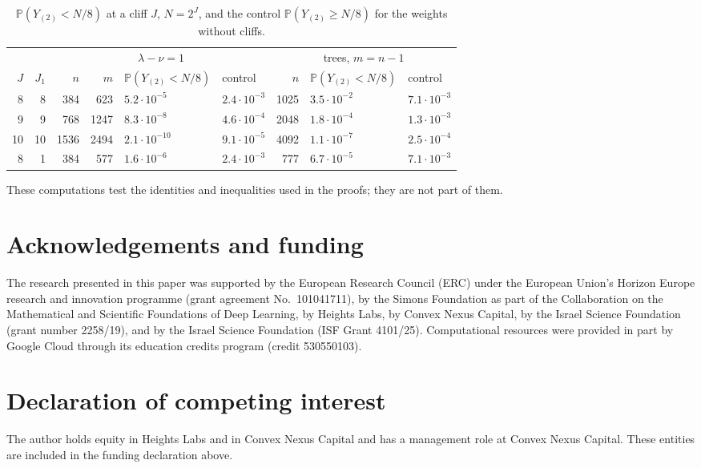 \documentclass[11pt]{amsart}
\theoremstyle{remark}
\numberwithin{equation}{section}
\newcommand{\Pp}{\mathbb P}
\begin{document}
\begin{table}[ht]
\small
\caption{$\Pp(Y_{(2)}<N/8)$ at a cliff $J$, $N=2^J$, and the control $\Pp(Y_{(2)}\ge N/8)$ for the weights without cliffs.}\label{tab:b5}
\begin{tabular}{rrrrllrll}
\toprule
&&\multicolumn{4}{c}{$\lambda-\nu=1$}&\multicolumn{3}{c}{trees, $m=n-1$}\\
\cmidrule(lr){3-6}\cmidrule(lr){7-9}
$J$&$J_1$&$n$&$m$&$\Pp(Y_{(2)}<N/8)$&control&$n$&$\Pp(Y_{(2)}<N/8)$&control\\
\midrule
8&8&384&623&$5.2\cdot10^{-5}$&$2.4\cdot10^{-3}$&1025&$3.5\cdot10^{-2}$&$7.1\cdot10^{-3}$\\
9&9&768&1247&$8.3\cdot10^{-8}$&$4.6\cdot10^{-4}$&2048&$1.8\cdot10^{-4}$&$1.3\cdot10^{-3}$\\
10&10&1536&2494&$2.1\cdot10^{-10}$&$9.1\cdot10^{-5}$&4092&$1.1\cdot10^{-7}$&$2.5\cdot10^{-4}$\\
8&1&384&577&$1.6\cdot10^{-6}$&$2.4\cdot10^{-3}$&777&$6.7\cdot10^{-5}$&$7.1\cdot10^{-3}$\\
\bottomrule
\end{tabular}
\end{table}

These computations test the identities and inequalities used in the proofs; they are not part of them.

\section*{Acknowledgements and funding}
The research presented in this paper was supported by the European Research
Council (ERC) under the European Union's Horizon Europe research and
innovation programme (grant agreement No.~101041711), by the Simons
Foundation as part of the Collaboration on the Mathematical and Scientific
Foundations of Deep Learning, by Heights Labs, by Convex Nexus Capital, by
the Israel Science Foundation (grant number 2258/19), and by the Israel
Science Foundation (ISF Grant 4101/25). Computational resources were
provided in part by Google Cloud through its education credits program
(credit 530550103).

\section*{Declaration of competing interest}
The author holds equity in Heights Labs and in Convex Nexus Capital and
has a management role at Convex Nexus Capital. These entities are included
in the funding declaration above.
\end{document}
